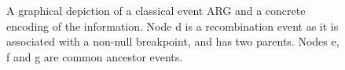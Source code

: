 \documentclass{article}
\newcommand{\noderef}[1]{\textsf{#1}}
\begin{document}
\begin{figure}
\begin{tikzpicture}[x=5mm, y=5mm, node distance=2mm and 20mm]
\end{tikzpicture}
\caption{\label{fig-arg-data-structure}
A graphical depiction of a classical event ARG and a concrete
encoding of the information. Node \noderef{d} is a recombination
event as it is associated with a non-null breakpoint, and has
two parents. Nodes \noderef{e}, \noderef{f} and \noderef{g} are
common ancestor events.
}
\end{figure}



\end{document}

